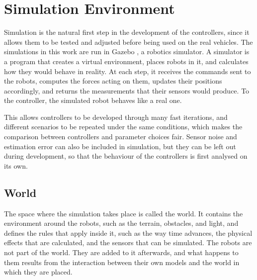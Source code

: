 
\section{Simulation Environment}
\label{sec:simulation_environment}

Simulation is the natural first step in the development of the controllers, since it allows them to be tested and adjusted before being used on the real vehicles. The simulations in this work are run in Gazebo \cite{koenig2004gazebo}, a robotics simulator. A simulator is a program that creates a virtual environment, places robots in it, and calculates how they would behave in reality. At each step, it receives the commands sent to the robots, computes the forces acting on them, updates their positions accordingly, and returns the measurements that their sensors would produce. To the controller, the simulated robot behaves like a real one.

This allows controllers to be developed through many fast iterations, and different scenarios to be repeated under the same conditions, which makes the comparison between controllers and parameter choices fair. Sensor noise and estimation error can also be included in simulation, but they can be left out during development, so that the behaviour of the controllers is first analysed on its own.

\subsection{World}
\label{sec:world}

The space where the simulation takes place is called the world. It contains the environment around the robots, such as the terrain, obstacles, and light, and defines the rules that apply inside it, such as the way time advances, the physical effects that are calculated, and the sensors that can be simulated. The robots are not part of the world. They are added to it afterwards, and what happens to them results from the interaction between their own models and the world in which they are placed.

